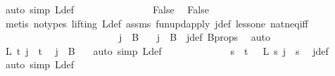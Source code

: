 \begin{isabellebody}
\ {\isacharparenleft}{\kern0pt}auto\ simp{\isacharcolon}{\kern0pt}\ L{\isacharprime}{\kern0pt}{\isacharunderscore}{\kern0pt}def{\isacharparenright}{\kern0pt}\isanewline
\ \ \ \ \ \ \ \ \ \ \ \ \isamarkupfalse%
\ \isamarkupfalse%
\ False\ \isamarkupfalse%
\ False\isanewline
\ \ \ \ \ \ \ \ \ \ \ \ \ \ \isamarkupfalse%
\ {\isacharparenleft}{\kern0pt}metis\ {\isacharparenleft}{\kern0pt}no{\isacharunderscore}{\kern0pt}types{\isacharcomma}{\kern0pt}\ lifting{\isacharparenright}{\kern0pt}\ L{\isacharprime}{\kern0pt}{\isacharunderscore}{\kern0pt}def\ assms{\isacharparenleft}{\kern0pt}{}{\isacharparenright}{\kern0pt}\ fun{\isacharunderscore}{\kern0pt}upd{\isacharunderscore}{\kern0pt}apply\ j{\isacharunderscore}{\kern0pt}def\ less{\isacharunderscore}{\kern0pt}one\ nat{\isacharunderscore}{\kern0pt}neq{\isacharunderscore}{\kern0pt}iff{\isacharparenright}{\kern0pt}\isanewline
\ \ \ \ \ \ \ \ \ \ \isamarkupfalse%
\isanewline
\ \ \ \ \ \ \ \ \ \ \isamarkupfalse%
\ \isamarkupfalse%
\ {\isachardoublequoteopen}j\ {\isasymin}\ B\ {}{\isachardoublequoteclose}\ \isamarkupfalse%
\ {\isacartoucheopen}j\ {\isasymnotin}\ B\ {}{\isacartoucheclose}\ j{\isacharunderscore}{\kern0pt}def\ B{\isacharunderscore}{\kern0pt}props\ \isamarkupfalse%
\ auto\isanewline
\isanewline
\ \ \ \ \ \ \ \ \ \ \isamarkupfalse%
\ \isamarkupfalse%
\ {\isachardoublequoteopen}L{\isacharprime}{\kern0pt}\ t\ j\ {\isacharequal}{\kern0pt}\ t{\isachardoublequoteclose}\ \isamarkupfalse%
\ {\isacartoucheopen}j\ {\isasymnotin}\ B\ {}{\isacartoucheclose}\ \isamarkupfalse%
\ {\isacharparenleft}{\kern0pt}auto\ simp{\isacharcolon}{\kern0pt}\ L{\isacharprime}{\kern0pt}{\isacharunderscore}{\kern0pt}def{\isacharparenright}{\kern0pt}\isanewline
\ \ \ \ \ \ \ \ \ \ \isamarkupfalse%
\ \isamarkupfalse%
\ {\isachardoublequoteopen}{\isacharparenleft}{\kern0pt}{\isasymforall}s\ {\isacharless}{\kern0pt}\ {\isacharparenleft}{\kern0pt}t\ {\isacharplus}{\kern0pt}\ {}{\isacharparenright}{\kern0pt}{\isachardot}{\kern0pt}\ L{\isacharprime}{\kern0pt}\ s\ j\ {\isacharequal}{\kern0pt}\ s{\isacharparenright}{\kern0pt}{\isachardoublequoteclose}\ \isamarkupfalse%
\ j{\isacharunderscore}{\kern0pt}def\ \isamarkupfalse%
\ {\isacharparenleft}{\kern0pt}auto\ simp{\isacharcolon}{\kern0pt}\ L{\isacharprime}{\kern0pt}{\isacharunderscore}{\kern0pt}def{\isacharparenright}{\kern0pt}\isanewline

\end{isabellebody}
